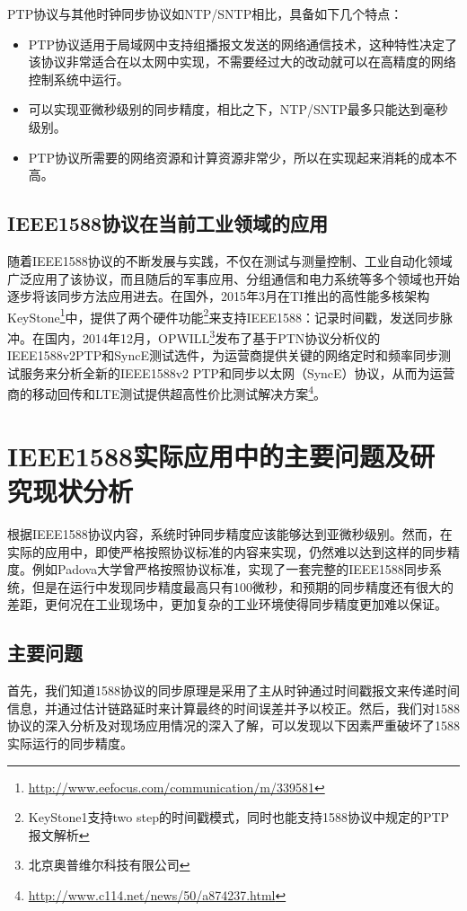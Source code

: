 PTP协议与其他时钟同步协议如NTP/SNTP相比，具备如下几个特点：
\begin{itemize}[noitemsep,topsep=0pt,parsep=0pt,partopsep=0pt]
	\item PTP协议适用于局域网中支持组播报文发送的网络通信技术，这种特性决定了该协议非常适合在以太网中实现，不需要经过大的改动就可以在高精度的网络控制系统中运行。
	\item 可以实现亚微秒级别的同步精度，相比之下，NTP/SNTP最多只能达到毫秒级别。
	\item PTP协议所需要的网络资源和计算资源非常少，所以在实现起来消耗的成本不高。
\end{itemize}


\subsection{IEEE1588协议在当前工业领域的应用}
\label{sec:application}
随着IEEE1588协议的不断发展与实践，不仅在测试与测量控制、工业自动化领域广泛应用了该协议，而且随后的军事应用、分组通信和电力系统等多个领域也开始逐步将该同步方法应用进去。在国外，2015年3月在TI推出的高性能多核架构KeyStone\footnote{\url{http://www.eefocus.com/communication/m/339581}}中，提供了两个硬件功能\footnote{KeyStone1支持two step的时间戳模式，同时也能支持1588协议中规定的PTP报文解析}来支持IEEE1588：记录时间戳，发送同步脉冲。在国内，2014年12月，OPWILL\footnote{北京奥普维尔科技有限公司}发布了基于PTN协议分析仪的IEEE1588v2PTP和SyncE测试选件，为运营商提供关键的网络定时和频率同步测试服务来分析全新的IEEE1588v2 PTP和同步以太网（SyncE）协议，从而为运营商的移动回传和LTE测试提供超高性价比测试解决方案\footnote{\url{http://www.c114.net/news/50/a874237.html}}。

\section{IEEE1588实际应用中的主要问题及研究现状分析}
根据IEEE1588协议内容，系统时钟同步精度应该能够达到亚微秒级别\supercite{2}。然而，在实际的应用中，即使严格按照协议标准的内容来实现，仍然难以达到这样的同步精度。例如Padova大学曾严格按照协议标准，实现了一套完整的IEEE1588同步系统\supercite{3}，但是在运行中发现同步精度最高只有100微秒，和预期的同步精度还有很大的差距，更何况在工业现场中，更加复杂的工业环境使得同步精度更加难以保证。

\subsection{主要问题}
\label{sec:1588_problem}
首先，我们知道1588协议的同步原理是采用了主从时钟通过时间戳报文来传递时间信息，并通过估计链路延时来计算最终的时间误差并予以校正。然后，我们对1588协议的深入分析及对现场应用情况的深入了解，可以发现以下因素严重破坏了1588实际运行的同步精度。

